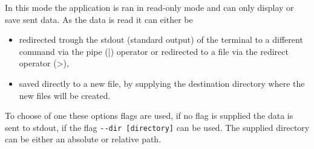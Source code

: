 In this mode the application is ran in read-only mode and can only display or save sent data. As the data is read it can either be
\begin{itemize}
  \item redirected trough the stdout (standard output) of the terminal to a different command via the pipe (|) operator or redirected to a file via the redirect operator (>),
  \item saved directly to a new file, by supplying the destination directory where the new files will be created.
\end{itemize}
To choose of one these options flags are used, if no flag is supplied the data is sent to stdout, if the flag \texttt{-\--dir [directory]} can be used. The supplied directory can be either an absolute or relative path.
